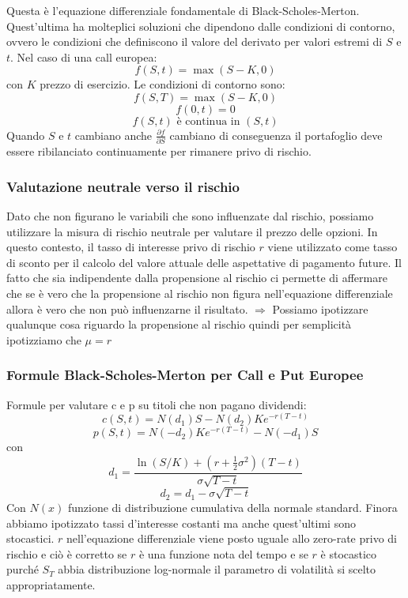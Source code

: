 \documentclass[12pt,a4paper]{report}
\begin{document}
Questa è l'equazione differenziale fondamentale di Black-Scholes-Merton.
\newline
Quest'ultima ha molteplici soluzioni che dipendono dalle condizioni di contorno, ovvero le condizioni che definiscono il valore del derivato per valori estremi di \(S\) e \(t\).
\newline
Nel caso di una call europea:
\[
f(S,t) = \max(S-K,0)
\]
con \(K\) prezzo di esercizio. Le condizioni di contorno sono:
\[
f(S,T) = \max(S-K,0)
\]
\[
f(0,t) = 0
\]
\[
f(S,t) \text{ è continua in } (S,t)
\]
Quando \(S\) e \(t\) cambiano anche \(\frac{\partial f}{\partial S} \) cambiano di conseguenza il portafoglio deve essere ribilanciato continuamente per rimanere privo di rischio.
\subsubsection{Valutazione neutrale verso il rischio}
Dato che non figurano le variabili che sono influenzate dal rischio, possiamo utilizzare la misura di rischio neutrale per valutare il prezzo delle opzioni. In questo contesto, il tasso di interesse privo di rischio \(r\) viene utilizzato come tasso di sconto per il calcolo del valore attuale delle aspettative di pagamento future.
Il fatto che sia indipendente dalla propensione al rischio ci permette di affermare che se è vero che la propensione al rischio non figura nell'equazione differenziale allora è vero che non può influenzarne il risultato.
\newline
\(\Longrightarrow\) Possiamo ipotizzare qualunque cosa riguardo la propensione al rischio quindi per semplicità ipotizziamo che \(\mu = r\)
\newpage
\subsubsection{Formule Black-Scholes-Merton per Call e Put Europee}
Formule per valutare c e p su titoli che non pagano dividendi:
\[
c(S,t) = N(d_1) S - N(d_2) K e^{-r(T-t)}
\]
\[
p(S,t) = N(-d_2) K e^{-r(T-t)} - N(-d_1) S
\]
con
\[
d_1 = \frac{\ln(S/K) + (r + \frac{1}{2} \sigma^2)(T-t)}{\sigma \sqrt{T-t}}
\]
\[
d_2 = d_1 - \sigma \sqrt{T-t}
\]
Con \(N(x)\) funzione di distribuzione cumulativa della normale standard.
Finora abbiamo ipotizzato tassi d'interesse costanti ma anche quest'ultimi sono stocastici. \(r\) nell'equazione differenziale viene posto uguale allo zero-rate privo di rischio e ciò è corretto se \(r\) è una funzione nota del tempo e se \(r\) è stocastico purché \(S_T\) abbia distribuzione log-normale il parametro di volatilità si scelto appropriatamente.
\end{document}

